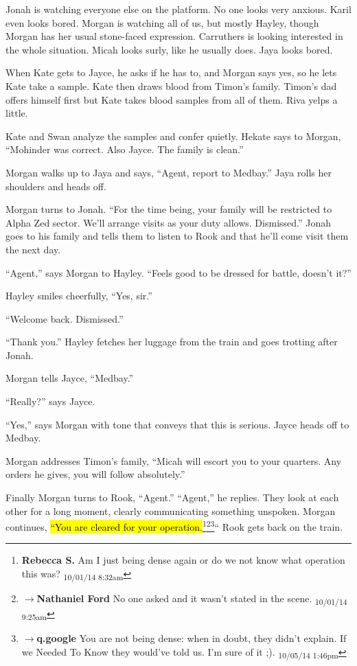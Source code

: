 Jonah is watching everyone else on the platform.  No one looks very anxious.  Karil even looks bored.  Morgan is watching all of us, but mostly Hayley, though Morgan has her usual stone-faced expression.  Carruthers is looking interested in the whole situation.  Micah looks surly, like he usually does.  Jaya looks bored.  



When Kate gets to Jayce, he asks if he has to, and Morgan says yes, so he lets Kate take a sample.  Kate then draws blood from Timon's family.  Timon's dad offers himself first but Kate takes blood samples from all of them.  Riva yelps a little.



Kate and Swan analyze the samples and confer quietly.  Hekate says to Morgan, ``Mohinder was correct. Also Jayce. The family is clean.''  



Morgan walks up to Jaya and says, ``Agent, report to Medbay.''  Jaya rolls her shoulders and heads off.

Morgan turns to Jonah. ``For the time being, your family will be restricted to Alpha Zed sector.  We'll arrange visits as your duty allows.  Dismissed.''  Jonah goes to his family and tells them to listen to Rook and that he'll come visit them the next day.

``Agent,'' says Morgan to Hayley. ``Feels good to be dressed for battle, doesn't it?''

Hayley smiles cheerfully, ``Yes, sir.''

``Welcome back.  Dismissed.''

``Thank you.''  Hayley fetches her luggage from the train and goes trotting after Jonah.

Morgan tells Jayce, ``Medbay.''

``Really?'' says Jayce.

``Yes,'' says Morgan with tone that conveys that this is serious.  Jayce heads off to Medbay.

Morgan addresses Timon's family, ``Micah will escort you to your quarters.  Any orders he gives, you will follow absolutely.''

Finally Morgan turns to Rook, ``Agent.''  ``Agent,'' he replies.  They look at each other for a long moment, clearly communicating something unspoken.  Morgan continues, \hl{``You are cleared for your operation.}\footnote{\textbf{Rebecca S. }Am I just being dense again or do we not know what operation this was? \textsubscript{10/01/14 8:32am}}\footnote{$\rightarrow$\textbf{Nathaniel Ford }No one asked and it wasn't stated in the scene. \textsubscript{10/01/14 9:25am}}\footnote{$\rightarrow$\textbf{q.google }You are not being dense: when in doubt, they didn't explain.  If we Needed To Know they would've told us.  I'm sure of it ;). \textsubscript{10/05/14 1:46pm}}``  Rook gets back on the train.


